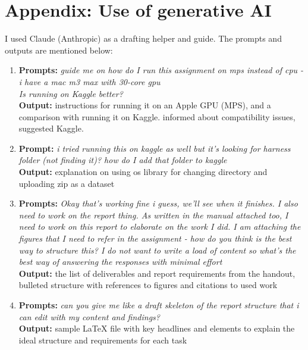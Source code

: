 \documentclass[10pt]{article}
\begin{document}
\section*{Appendix: Use of generative AI}
I used Claude (Anthropic) as a drafting helper and guide. The prompts and outputs are mentioned below:
\begin{enumerate}[leftmargin=1.5em]
\item \textbf{Prompts:} {\itshape guide me on how do I run this assignment on mps instead of cpu - i have a mac m3 max with 30-core gpu}\\
{\itshape Is running on Kaggle better?}\\
\textbf{Output:} instructions for running it on an Apple GPU (MPS), and a comparison with running it on Kaggle. informed about compatibility issues, suggested Kaggle.
\item \textbf{Prompt:} {\itshape i tried running this on kaggle as well but it's looking for harness folder (not finding it)? how do I add that folder to kaggle}\\
\textbf{Output:} explanation on using os library for changing directory and uploading zip as a dataset
\item \textbf{Prompts:} {\itshape Okay that's working fine i guess, we'll see when it finishes. I also need to work on the report thing. As written in the manual attached too, I need to work on this report to elaborate on the work I did. I am attaching the figures that I need to refer in the assignment - how do you think is the best way to structure this? I do not want to write a load of content so what's the best way of answering the responses with minimal effort}\\
\textbf{Output:} the list of deliverables and report requirements from the handout, bulleted structure with references to figures and citations to used work
\item \textbf{Prompts:} {\itshape can you give me like a draft skeleton of the report structure that i can edit with my content and findings?}\\
\textbf{Output:} sample LaTeX file with key headlines and elements to explain the ideal structure and requirements for each task
\end{enumerate}
\end{document}
